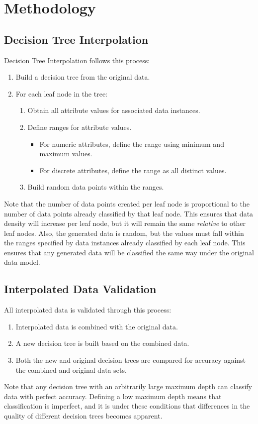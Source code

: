 \documentclass{sig-alternate}
\begin{document}
\section{Methodology}
\subsection{Decision Tree Interpolation}
Decision Tree Interpolation follows this process:
\begin{enumerate}
    \item Build a decision tree from the original data.
    \item For each leaf node in the tree:
    \begin{enumerate}
        \item Obtain all attribute values for associated data instances.
        \item Define ranges for attribute values.
        \begin{itemize}
            \item For numeric attributes, define the range using minimum and maximum values.
            \item For discrete attributes, define the range as all distinct values.
        \end{itemize}
        \item Build random data points within the ranges.
    \end{enumerate}
\end{enumerate}
Note that the number of data points created per leaf node is proportional to the number of data points already classified by that leaf node. This ensures that data density will increase per leaf node, but it will remain the same \textit{relative} to other leaf nodes. Also, the generated data is random, but the values must fall within the ranges specified by data instances already classified by each leaf node. This ensures that any generated data will be classified the same way under the original data model.

\subsection{Interpolated Data Validation}
All interpolated data is validated through this process:
\begin{enumerate}
    \item Interpolated data is combined with the original data.
    \item A new decision tree is built based on the combined data.
    \item Both the new and original decision trees are compared for accuracy against the combined and original data sets.
\end{enumerate}
Note that any decision tree with an arbitrarily large maximum depth can classify data with perfect accuracy. Defining a low maximum depth means that classification is imperfect, and it is under these conditions that differences in the quality of different decision trees becomes apparent.
\end{document}
